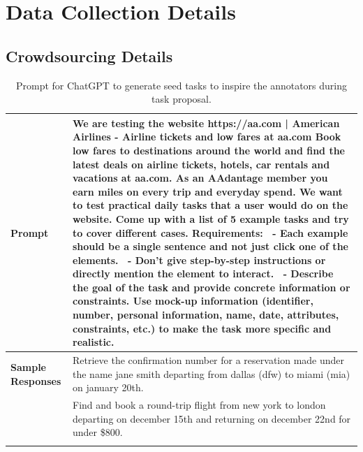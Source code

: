 \section{Data Collection Details}
\label{app:data}
\subsection{Crowdsourcing Details}
\begin{table}[]
    \centering
    \small
    \caption{Prompt for ChatGPT to generate seed tasks to inspire the annotators during task proposal.}
    \begin{tabular}{lp{10cm}}
    \toprule
      \textbf{Prompt}   &  
      {We are testing the website\newline\newline
      https://aa.com | American Airlines - Airline tickets and low fares at aa.com\newline
      Book low fares to destinations around the world and find the latest deals on airline tickets, hotels, car rentals and vacations at aa.com. As an AAdantage member you earn miles on every trip and everyday spend.\newline\newline
      We want to test practical daily tasks that a user would do on the website.\newline
      Come up with a list of 5 example tasks and try to cover different cases.\newline
      Requirements:\newline\newline
    \ - Each example should be a single sentence and not just click one of the elements.\newline
    \ - Don't give step-by-step instructions or directly mention the element to interact.\newline
    \ - Describe the goal of the task and provide concrete information or constraints. Use mock-up information (identifier, number, personal information, name, date, attributes, constraints, etc.) to make the task more specific and realistic.}\\\midrule
        \textbf{Sample Responses}&Retrieve the confirmation number for a reservation made under the name jane smith departing from dallas (dfw) to miami (mia) on january 20th.\\\addlinespace
            &Find and book a round-trip flight from new york to london departing on december 15th and returning on december 22nd for under \$800.\\\addlinespace

\end{tabular}
\end{table}
